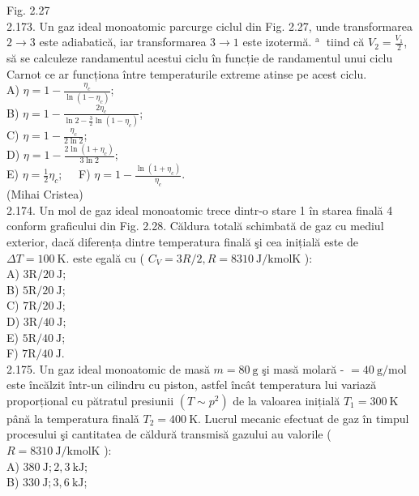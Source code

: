 \documentclass[10pt]{article}
\begin{document}
Fig. 2.27\\
2.173. Un gaz ideal monoatomic parcurge ciclul din Fig. 2.27, unde transformarea $2 \rightarrow 3$ este adiabatică, iar transformarea $3 \rightarrow 1$ este izotermă. ${ }^{\text {a }}$ tiind că $V_{2}=\frac{V_{1}}{2}$, să se calculeze randamentul acestui ciclu în funcție de randamentul unui ciclu Carnot ce ar funcționa între temperaturile extreme atinse pe acest ciclu.\\
A) $\eta=1-\frac{\eta_{c}}{\ln \left(1-\eta_{c}\right)}$;\\
B) $\eta=1-\frac{2 \eta_{c}}{\ln 2-\frac{3}{2} \ln \left(1-\eta_{c}\right)}$;\\
C) $\eta=1-\frac{\eta_{c}}{2 \ln 2}$;\\
D) $\eta=1-\frac{2 \ln \left(1+\eta_{c}\right)}{3 \ln 2}$;\\
E) $\eta=\frac{1}{2} \eta_{c} ; \quad$ F) $\eta=1-\frac{\ln \left(1+\eta_{c}\right)}{\eta_{c}}$.\\
(Mihai Cristea)\\
2.174. Un mol de gaz ideal monoatomic trece dintr-o stare 1 în starea finală 4 conform graficului din Fig. 2.28. Căldura totală schimbată de gaz cu mediul exterior, dacă diferența dintre temperatura finală şi cea inițială este de $\Delta T=100 \mathrm{~K}$. este egală cu ( $C_{V}=3 R / 2, R=8310 \mathrm{~J} / \mathrm{kmol} \mathrm{K}$ ):\\
A) $3 \mathrm{R} / 20 \mathrm{~J}$;\\
B) $5 \mathrm{R} / 20 \mathrm{~J}$;\\
C) $7 \mathrm{R} / 20 \mathrm{~J}$;\\
D) $3 \mathrm{R} / 40 \mathrm{~J}$;\\
E) $5 \mathrm{R} / 40 \mathrm{~J}$;\\
F) $7 \mathrm{R} / 40 \mathrm{~J}$.\\
2.175. Un gaz ideal monoatomic de masă $m=80 \mathrm{~g}$ şi masă molară - $=40 \mathrm{~g} / \mathrm{mol}$ este încălzit într-un cilindru cu piston, astfel încât temperatura lui variază proporțional cu pătratul presiunii $\left(T \sim p^{2}\right)$ de la valoarea inițială $T_{1}=300 \mathrm{~K}$ până la temperatura finalǎ $T_{2}=400 \mathrm{~K}$. Lucrul mecanic efectuat de gaz în timpul procesului şi cantitatea de căldură transmisă gazului au valorile ( $R=8310 \mathrm{~J} / \mathrm{kmol} \mathrm{K}$ ):\\
A) $380 \mathrm{~J} ; 2,3 \mathrm{~kJ}$;\\
B) $330 \mathrm{~J} ; 3,6 \mathrm{~kJ}$;\\
\end{document}
